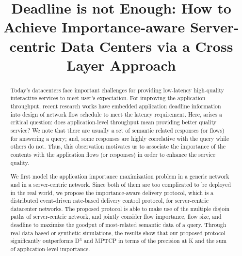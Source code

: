 \documentclass[conference]{IEEEtran}
\begin{document}
\title{Deadline is not Enough: How to Achieve Importance-aware Server-centric Data Centers via a Cross Layer Approach}

\author{
}














\maketitle


\begin{abstract}
Today's datacenters face important challenges for providing low-latency high-quality interactive services to meet user's expectation.
For improving the application throughput, recent research works have embedded application deadline information into design of network flow schedule to meet the latency requirement. Here, arises a critical question: does application-level throughput mean providing better quality service?
We note that there are usually a set of semantic related responses (or flows) for answering a query; and, some responses are highly correlative with the query while others do not.
Thus, this observation motivates us to associate the importance of the contents with the application flows (or responses) in order to enhance the service quality.

We first model the application importance maximization problem in a generic network and in a server-centric network. Since both of them are too complicated to be deployed in the real world, we propose the importance-aware delivery protocol, which is a distributed event-driven rate-based delivery control protocol, for server-centric datacenter networks. The proposed protocol is able to make use of the multiple disjoin paths of server-centric network, and jointly consider flow importance, flow size, and deadline to maximize the goodput of most-related semantic data of a query. Through real-data-based or synthetic simulations, the results show that our proposed protocol significantly outperforms D$^{3}$ and MPTCP in terms of the precision at K and the sum of application-level importance.
\end{abstract}
\end{document}
